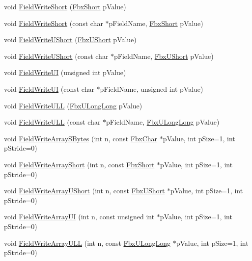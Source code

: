 \begin{Indent}
\begin{DoxyCompactItemize}
\item 
void \hyperlink{class_fbx_i_o_adf2e2d126cae6dee5ffa06c3d1101ab2}{Field\+Write\+Short} (\hyperlink{fbxtypes_8h_a56e7a4f56baf132527df7c3cd07017b7}{Fbx\+Short} p\+Value)
\item 
void \hyperlink{class_fbx_i_o_aa632506474caebbe7f896a19315bce6a}{Field\+Write\+Short} (const char $\ast$p\+Field\+Name, \hyperlink{fbxtypes_8h_a56e7a4f56baf132527df7c3cd07017b7}{Fbx\+Short} p\+Value)
\item 
void \hyperlink{class_fbx_i_o_ab15354aacbd29fe99299e5dc8fc14c55}{Field\+Write\+U\+Short} (\hyperlink{fbxtypes_8h_a321ef060885fc068fd77ac69a49f51d9}{Fbx\+U\+Short} p\+Value)
\item 
void \hyperlink{class_fbx_i_o_aaa6b02d1dec6c8cbe0f37758f18b00f2}{Field\+Write\+U\+Short} (const char $\ast$p\+Field\+Name, \hyperlink{fbxtypes_8h_a321ef060885fc068fd77ac69a49f51d9}{Fbx\+U\+Short} p\+Value)
\item 
void \hyperlink{class_fbx_i_o_a147f91908e2827f726134c09324b1c75}{Field\+Write\+UI} (unsigned int p\+Value)
\item 
void \hyperlink{class_fbx_i_o_af153920402b58b19122e8efc3e9f99a9}{Field\+Write\+UI} (const char $\ast$p\+Field\+Name, unsigned int p\+Value)
\item 
void \hyperlink{class_fbx_i_o_a928c7ed7cde0e3f4aebf36ba09ebe1cd}{Field\+Write\+U\+LL} (\hyperlink{fbxtypes_8h_a267f848573cc1e685aa510be4b1298c8}{Fbx\+U\+Long\+Long} p\+Value)
\item 
void \hyperlink{class_fbx_i_o_a16ecbb922b4ff5bc6982c63f493eb9aa}{Field\+Write\+U\+LL} (const char $\ast$p\+Field\+Name, \hyperlink{fbxtypes_8h_a267f848573cc1e685aa510be4b1298c8}{Fbx\+U\+Long\+Long} p\+Value)
\item 
void \hyperlink{class_fbx_i_o_ab0215715599672d75bca03fbfc943ff6}{Field\+Write\+Array\+S\+Bytes} (int n, const \hyperlink{fbxtypes_8h_a34067dfe395a7cf3040b7b263c9024d2}{Fbx\+Char} $\ast$p\+Value, int p\+Size=1, int p\+Stride=0)
\item 
void \hyperlink{class_fbx_i_o_a45e904af18c03b8950c87d6e2bbd142f}{Field\+Write\+Array\+Short} (int n, const \hyperlink{fbxtypes_8h_a56e7a4f56baf132527df7c3cd07017b7}{Fbx\+Short} $\ast$p\+Value, int p\+Size=1, int p\+Stride=0)
\item 
void \hyperlink{class_fbx_i_o_a8bb20add8db083913c19db275f7ef8ac}{Field\+Write\+Array\+U\+Short} (int n, const \hyperlink{fbxtypes_8h_a321ef060885fc068fd77ac69a49f51d9}{Fbx\+U\+Short} $\ast$p\+Value, int p\+Size=1, int p\+Stride=0)
\item 
void \hyperlink{class_fbx_i_o_ad5663cf5ed6a3b7fba6bb4ca62243b6f}{Field\+Write\+Array\+UI} (int n, const unsigned int $\ast$p\+Value, int p\+Size=1, int p\+Stride=0)
\item 
void \hyperlink{class_fbx_i_o_a4b4a55bd86e8b19ed20763fb3720b430}{Field\+Write\+Array\+U\+LL} (int n, const \hyperlink{fbxtypes_8h_a267f848573cc1e685aa510be4b1298c8}{Fbx\+U\+Long\+Long} $\ast$p\+Value, int p\+Size=1, int p\+Stride=0)
\end{DoxyCompactItemize}
\end{Indent}
